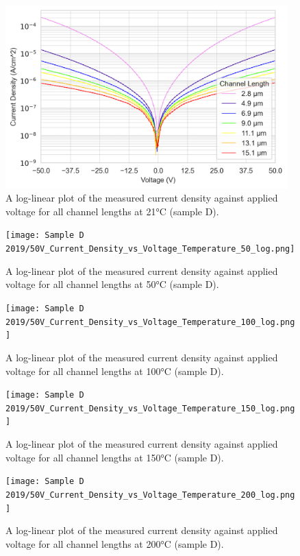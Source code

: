 \label{app:J_V_sample_D_10V}
\begin{figure}[h]
    \centering
    \includegraphics[width=0.97\textwidth]{Chapter6/Figs/Raster/Sample D 2019/50V_Current_Density_vs_Voltage_Temperature_21_log.png}
    \caption{A log-linear plot of the measured current density against applied voltage for all channel lengths at 21\si{\degreeCelsius} (sample D).}
    \label{appfig:D_current_density_21}
\end{figure}
\begin{figure}[h]
    \centering
    \texttt{[image: Sample D 2019/50V\_Current\_Density\_vs\_Voltage\_Temperature\_50\_log.png]}
    \caption{A log-linear plot of the measured current density against applied voltage for all channel lengths at 50\si{\degreeCelsius} (sample D).}
    \label{appfig:D_current_density_50}
\end{figure}
\begin{figure}[h]
    \centering
    \texttt{[image: Sample D 2019/50V\_Current\_Density\_vs\_Voltage\_Temperature\_100\_log.png]}
    \caption{A log-linear plot of the measured current density against applied voltage for all channel lengths at 100\si{\degreeCelsius} (sample D).}
    \label{appfig:D_current_density_100}
\end{figure}
\begin{figure}[h]
    \centering
    \texttt{[image: Sample D 2019/50V\_Current\_Density\_vs\_Voltage\_Temperature\_150\_log.png]}
    \caption{A log-linear plot of the measured current density against applied voltage for all channel lengths at 150\si{\degreeCelsius} (sample D).}
    \label{appfig:D_current_density_150}
\end{figure}
\begin{figure}[h]
    \centering
    \texttt{[image: Sample D 2019/50V\_Current\_Density\_vs\_Voltage\_Temperature\_200\_log.png]}
    \caption{A log-linear plot of the measured current density against applied voltage for all channel lengths at 200\si{\degreeCelsius} (sample D).}
    \label{appfig:D_current_density_200}
\end{figure}
